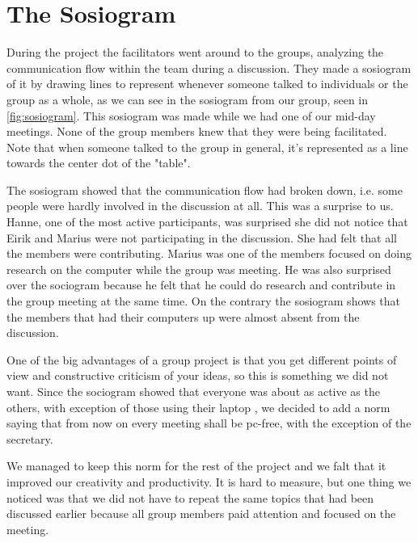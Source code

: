 \section{The Sosiogram}
During the project the facilitators went around to the groups, analyzing the communication flow within the team during a discussion. They made a sosiogram of it by drawing lines to represent whenever someone talked to individuals or the group as a whole, as we can see in the sosiogram from our group, seen in \autoref{fig:sosiogram}. This sosiogram was made while we had one of our mid-day meetings. None of the group members knew that they were being facilitated. Note that when someone talked to the group in general, it's represented as a line towards the center dot of the "table".

The sosiogram showed that the communication flow had broken down, i.e. some people were hardly involved in the discussion at all. This was a surprise to us. Hanne, one of the most active participants, was surprised she did not notice that Eirik and Marius were not participating in the discussion. She had felt that all the members were contributing. Marius was one of the members focused on doing research on the computer while the group was meeting. He was also surprised over the sociogram because he felt that he could do research and contribute in the group meeting at the same time. On the contrary the sosiogram shows that the members that had their computers up were almost absent from the discussion.

One of the big advantages of a group project is that you get different points of view and constructive criticism of your ideas, so this is something we did not want. Since the sociogram showed that everyone was about as active as the others, with exception of those using their laptop , we decided to add a norm saying that from now on every meeting shall be pc-free, with the exception of the secretary. 

We managed to keep this norm for the rest of the project and we falt that it improved our creativity and productivity. It is hard to measure, but one thing we noticed was that we did not have to repeat the same topics that had been discussed earlier because all group members paid attention and focused on the meeting. 


